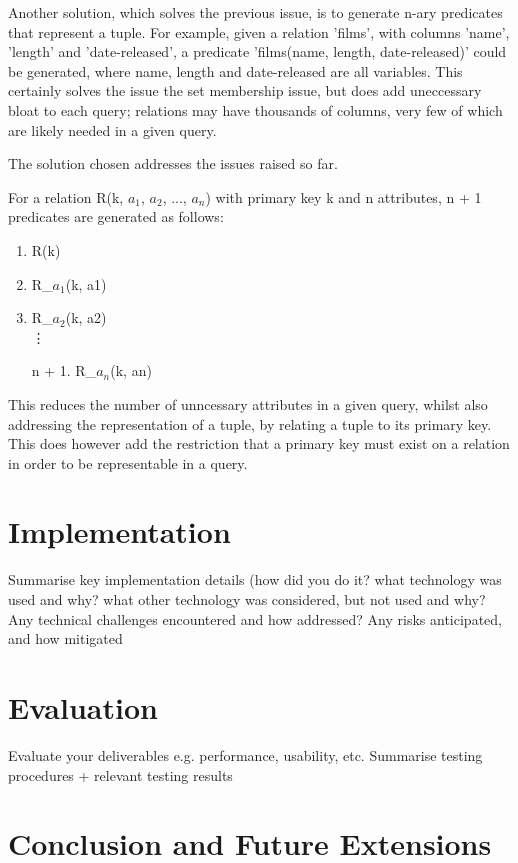 \documentclass[a4wide, 11pt]{article}
\begin{document}
Another solution, which solves the previous issue, is to generate n-ary predicates
that represent a tuple. For example, given a relation 'films', with columns
'name', 'length' and 'date-released', a predicate 'films(name, length,
date-released)' could be generated, where name, length and date-released are
all variables. This certainly solves the issue the set membership issue, but
does add uneccessary bloat to each query; relations may have thousands of
columns, very few of which are likely needed in a given query.

The solution chosen addresses the issues raised so far.

For a relation R(k, $a_{1}$, $a_{2}$, ..., $a_{n}$) with primary key k and n
attributes, n + 1 predicates are generated as follows:
\begin{enumerate}
\item R(k)
\item R\_$a_{1}$(k, a1)
\item R\_$a_{2}$(k, a2)
\\ \vdots
\item[n + 1.] R\_$a_{n}$(k, an)
\end{enumerate}

This reduces the number of unncessary attributes in a given query, whilst also
addressing the representation of a tuple, by relating a tuple to its primary
key. This does however add the restriction that a primary key must exist on a
relation in order to be representable in a query.

\section{Implementation}

        Summarise key implementation details (how did you do it? what technology was used and why? what other technology was considered, but not used and why?
        Any technical challenges encountered and how addressed?
        Any risks anticipated, and how mitigated 

\section{Evaluation}

        Evaluate your deliverables e.g. performance, usability, etc.
        Summarise testing procedures + relevant testing results 

\section{Conclusion and Future Extensions}
\end{document}
